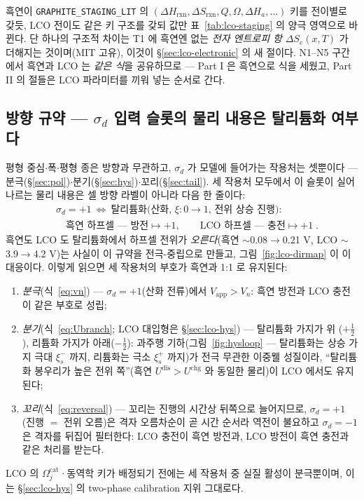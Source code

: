 \documentclass[11pt,a4paper]{article}
\newcommand{\app}{\mathrm{app}}
\newcommand{\rxn}{\mathrm{rxn}}
\newcommand{\dis}{\mathrm{dis}}
\newcommand{\chg}{\mathrm{chg}}
\newcommand{\code}[1]{\texttt{#1}}
\begin{document}
흑연이 \code{GRAPHITE\_STAGING\_LIT} 의 $(\Delta H_\rxn,\Delta S_\rxn,Q,\Omega,\Delta H_a,\dots)$ 키를 전이별로 갖듯,
LCO 전이도 같은 키 구조를 갖되 값만 표~\ref{tab:lco-staging} 의 양극 영역으로 바뀐다. 단 하나의 구조적 차이는 T1 에
흑연엔 없는 \emph{전자 엔트로피 항} $\Delta S_e(x,T)$ 가 더해지는 것이며(MIT 고유), 이것이 \S\ref{sec:lco-electronic}
의 새 절이다. N1--N5 구간에서 흑연과 LCO 는 \emph{같은 식}을 공유하므로 --- Part I 은 흑연으로 식을 세웠고,
Part II 의 절들은 LCO 파라미터를 끼워 넣는 순서로 간다.

\subsection{방향 규약 --- $\sigma_d$ 입력 슬롯의 물리 내용은 탈리튬화 여부다}\label{sec:lco-direction}
평형 중심$\cdot$폭$\cdot$평형 종은 방향과 무관하고, $\sigma_d$ 가 모델에 들어가는 작용처는 셋뿐이다 ---
분극(\S\ref{sec:pol})$\cdot$분기(\S\ref{sec:hys})$\cdot$꼬리(\S\ref{sec:tail}). 세 작용처 모두에서 이 슬롯이
실어 나르는 물리 내용은 셀 방향 라벨이 아니라 다음 한 줄이다:
\begin{equation}
\boxed{\;\begin{aligned}
&\sigma_d=+1\ \Leftrightarrow\ \text{탈리튬화(산화, $\xi:0\!\to\!1$, 전위 상승 진행)}:\\
&\quad\text{흑연 하프셀 --- 방전}\mapsto+1,\qquad \text{LCO 하프셀 --- 충전}\mapsto+1\;.
\end{aligned}}
\label{eq:lco-sigmaslot}
\end{equation}
흑연도 LCO 도 탈리튬화에서 하프셀 전위가 \emph{오른다}(흑연 $\sim$0.08$\to$0.21 V, LCO
$\sim$3.9$\to$4.2 V)는 사실이 이 규약을 전극-중립으로 만들고, 그림~\ref{fig:lco-dirmap} 이 이 대응이다.
이렇게 읽으면 세 작용처의 부호가 흑연과 1:1 로 유지된다:
\begin{enumerate}[label=(\alph*),leftmargin=2.2em,itemsep=1pt]
\item \emph{분극}(식~\eqref{eq:vn}) --- $\sigma_d=+1$(산화 전류)에서 $V_\app>V_n$: 흑연 방전과 LCO 충전이
같은 부호로 성립;
\item \emph{분기}(식~\eqref{eq:Ubranch}; LCO 대입형은 \S\ref{sec:lco-hys}) --- 탈리튬화 가지가 위
($+\tfrac12$), 리튬화 가지가 아래($-\tfrac12$): 과주행 기하(그림~\ref{fig:hysloop} --- 탈리튬화는 상승
가지 극대 $\xi_s^-$ 까지, 리튬화는 극소 $\xi_s^+$ 까지)가 전극 무관한 이중웰 성질이라, ``탈리튬화 봉우리가
높은 전위 쪽''(흑연 $U^{\dis}>U^{\chg}$ 와 동일한 물리)이 LCO 에서도 유지된다;
\item \emph{꼬리}(식~\eqref{eq:reversal}) --- 꼬리는 진행의 시간상 뒤쪽으로 늘어지므로, $\sigma_d=+1$
(진행 $=$ 전위 오름)은 격자 오름차순이 곧 시간 순서라 역전이 불요하고 $\sigma_d=-1$ 은 격자를 뒤집어
필터한다: LCO 충전이 흑연 방전과, LCO 방전이 흑연 충전과 같은 처리를 받는다.
\end{enumerate}
LCO 의 $\Omega_j^\mathrm{cat}$·동역학 키가 배정되기 전에는 세 작용처 중 실질 활성이 분극뿐이며, 이는
\S\ref{sec:lco-hys} 의 two-phase calibration 지위 그대로다.
\end{document}
